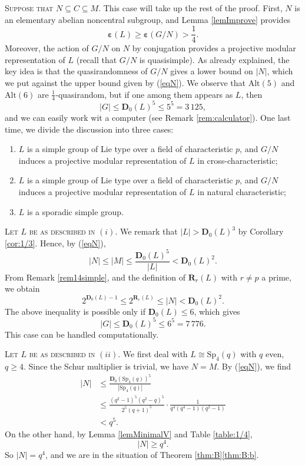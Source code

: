 \documentclass{daj}
\theoremstyle{definition}
\theoremstyle{remark}
\newcommand{\Alt}{\mathrm{Alt}}
\newcommand{\D}{\mathbf{D}}
\newcommand{\Di}{\mathbf{R}}
\renewcommand{\a}{\boldsymbol{\varepsilon}}
\begin{document}
	\smallskip \noindent \textsc{Suppose that $N \subseteq C \subseteq M$.}
	This case will take up the rest of the proof.
	First, $N$ is an elementary abelian noncentral subgroup, and Lemma \ref{lemImprove} provides
	$$ \a(L) \geq \a(G/N) > \frac{1}{4} . $$
	Moreover, the action of $G/N$ on $N$ by conjugation provides a
	projective modular representation of $L$ (recall that $G/N$ is quasisimple).
	As already explained, the key idea is that the quasirandomness of $G/N$ gives a lower bound on $|N|$,
	which we put against the upper bound given by (\ref{eqN}).
	We observe that $\Alt(5)$ and $\Alt(6)$ are $\frac{1}{4}$-quasirandom, but if one among them appears as $L$,
	then
	$$ |G| \leq \D_0(L)^5 \leq 5^5 = 3\,125 , $$
	and we can easily work wit a computer (see Remark \ref{rem:calculator}).
	One last time, we divide the discussion into three cases:
	\begin{enumerate}[$(i)$]
		\item $L$ is a simple group of Lie type
		over a field of characteristic $p$, and $G/N$ induces a projective modular representation of $L$ in cross-characteristic;
		\item $L$ is a simple group of Lie type
		over a field of characteristic $p$, and $G/N$ induces a projective modular representation of $L$ in natural characteristic;
		\item $L$ is a sporadic simple group.
	\end{enumerate}
	
	\smallskip \noindent \textsc{Let $L$ be as described in $(i)$.}
	We remark that $|L| > \D_0(L)^3$ by Corollary \ref{cor:1/3}.
	Hence, by (\ref{eqN}), 
	$$ |N| \leq |M| \leq \frac{\D_0(L)^5}{|L|} < \D_0(L)^2 . $$
	From Remark \ref{rem14simple}, and the definition of $\Di_r(L)$ with $r\ne p$ a prime, we obtain
	$$ 2^{\D_0(L) -1} \leq 2^{\Di_r(L)} \leq |N| < \D_0(L)^2  . $$
	The above inequality is possible only if $\D_0(L) \leq 6$, which gives
	$$ |G| \leq \D_0(L)^5 \leq 6^5 = 7 \, 776 . $$
	This case can be handled computationally.
	
	\smallskip \noindent \textsc{Let $L$ be as described in $(ii)$.} 
	We first deal with $L \cong \mathrm{Sp}_4(q)$ with $q$ even, $q \geq 4$.
	Since the Schur multiplier is trivial, we have $N=M$.
	By (\ref{eqN}), we find
	\[\begin{split}
		|N|
		&\leq \frac{\D_0(\mathrm{Sp}_4(q))^5}{|\mathrm{Sp}_4(q)|} 
		\\&\leq  \frac{(q^2-1)^5(q^2-q)^5}{2^5(q+1)^{5}}\cdot \frac{1}{q^4(q^4-1)(q^2-1)}
		\\&< q^5 . 
	\end{split} \] 
	On the other hand, by Lemma \ref{lemMinimalV} and Table \ref{table:1/4},
	$$ |N| \geq q^4 . $$
	So $|N|=q^4$, and we are in the situation of Theorem \ref{thm:B}\ref{thm:B:b}.
	
\end{document}
